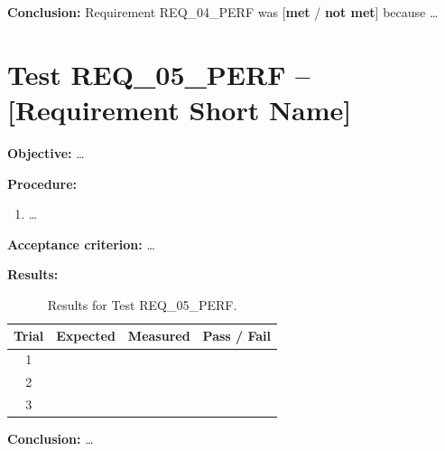 \textbf{Conclusion:} Requirement REQ\_04\_PERF was
[\textbf{met} / \textbf{not met}] because \ldots

\section{Test REQ\_05\_PERF – [Requirement Short Name]}
\label{sec:test-req05}

\textbf{Objective:} \ldots

\textbf{Procedure:}
\begin{enumerate}
    \item \ldots
\end{enumerate}

\textbf{Acceptance criterion:} \ldots

\textbf{Results:}

\begin{table}[H]
    \centering
    \caption{Results for Test REQ\_05\_PERF.}
    \label{tab:test-req05}
    \begin{tabular}{@{} c c c c @{}}
        \toprule
        \textbf{Trial} & \textbf{Expected} & \textbf{Measured}
            & \textbf{Pass / Fail} \\
        \midrule
        1 & & & \\
        2 & & & \\
        3 & & & \\
        \bottomrule
    \end{tabular}
\end{table}

\textbf{Conclusion:} \ldots


